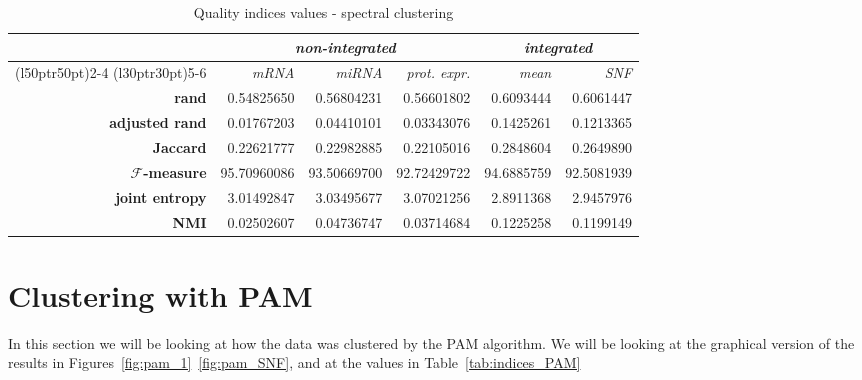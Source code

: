 \begin{table}
    \centering
    \begin{tabularx}{\linewidth}{rrrrrr}
         & \multicolumn{3}{c}{\textit{non-integrated}} & \multicolumn{2}{c}{\textit{integrated}} \\
         \cmidrule(l{50pt}r{50pt}){2-4} 
         \cmidrule(l{30pt}r{30pt}){5-6}
         & \textit{mRNA} & \textit{miRNA} & \textit{prot. expr.} & \textit{mean} & \textit{SNF}\\
        \midrule
        \textbf{rand} & 0.54825650 & 0.56804231 & 0.56601802 & 0.6093444 & 0.6061447\\
        \textbf{adjusted rand} & 0.01767203 & 0.04410101 & 0.03343076 & 0.1425261 & 0.1213365\\
        \textbf{Jaccard} & 0.22621777 & 0.22982885 & 0.22105016 & 0.2848604 & 0.2649890\\
        \textbf{$\mathcal{F}$-measure} & 95.70960086 & 93.50669700 & 92.72429722 & 94.6885759 & 92.5081939\\
        \textbf{joint entropy} & 3.01492847 & 3.03495677 & 3.07021256 & 2.8911368 & 2.9457976\\
        \textbf{NMI} & 0.02502607 & 0.04736747 & 0.03714684 & 0.1225258 & 0.1199149\\
        \bottomrule		
    \end{tabularx}
    \caption{Quality indices values - spectral clustering}\label{tab:indices_sc}
\end{table}
\section{Clustering with PAM}\label{results_pam}
In this section we will be looking at how the data was clustered by the PAM algorithm. We will be looking at the graphical version of the results in Figures~\ref{fig:pam_1}~\ref{fig:pam_SNF}, and at the values in Table~\ref{tab:indices_PAM}
